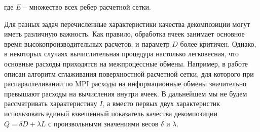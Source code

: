 где $E$ -- множество всех ребер расчетной сетки.

Для разных задач перечисленные характеристики качества декомпозиции могут иметь различную важность.
Как правило, обработка ячеек занимает основное время высокопроизводительных расчетов, и параметр $D$ более критичен.
Однако, в некоторых случаях вычислительная процедура настолько легковесная, что основные расходы приходятся на межпроцессные обмены.
Например, в работе \cite{Tong2017Remesh} описан алгоритм сглаживания поверхностной расчетной сетки, для которого при распараллеливании по MPI расходы на информационные обмены значительно превышают расходы на вычисления внутри ячеек.
В дальнейшем мы не будем рассматривать характеристику $I$, а вместо первых двух характеристик использовать единый взвешенный показатель качества декомпозиции $Q = \delta D + \lambda L$ с произвольными значениями весов $\delta$ и $\lambda$.
